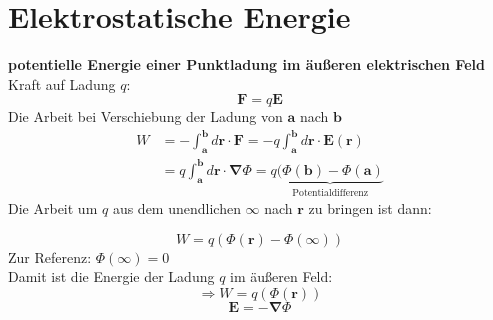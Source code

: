 \documentclass[titlepage,11pt,a4paper,ngerman]{report}
\newcommand{\tx}[1]{\textrm{#1}}
\newcommand{\ub}[1]{\underbrace{#1}}
\renewcommand{\vec}[1]{\boldsymbol{#1}}
\begin{document}
\section{Elektrostatische Energie}
\textbf{potentielle Energie einer Punktladung im äußeren elektrischen Feld}\\
Kraft auf Ladung $ q $:
\begin{equation*}
\vec{F} = q \vec{E}
\end{equation*}
Die Arbeit bei Verschiebung der Ladung von $ \vec{a} $ nach $ \vec{b} $
\begin{align*}
W &= - \int_{\vec{a}}^{\vec{b}} d\vec{r} \cdot \vec{F} = - q \int_{\vec{a}}^{\vec{b}} d\vec{r} \cdot \vec{E}(\vec{r})\\
&= q \int_{\vec{a}}^{\vec{b}} d\vec{r} \cdot \vec{\nabla} \Phi = q \ub{( \Phi(\vec{b}) - \Phi(\vec{a})}_{\tx{Potentialdifferenz}}
\end{align*}
Die Arbeit um $ q $ aus dem unendlichen $ \infty $ nach $ \vec{r} $ zu bringen ist dann:

\begin{equation*}
W = q (\Phi(\vec{r}) - \Phi(\infty))
\end{equation*}
Zur Referenz: $ \Phi(\infty) = 0 $\\
Damit ist die Energie der Ladung $ q $ im äußeren Feld:
\begin{equation*}
\Rightarrow W = q (\Phi(\vec{r}))
\end{equation*}
\begin{equation*}
\vec{E} = - \vec{\nabla} \Phi
\end{equation*}
\end{document}
